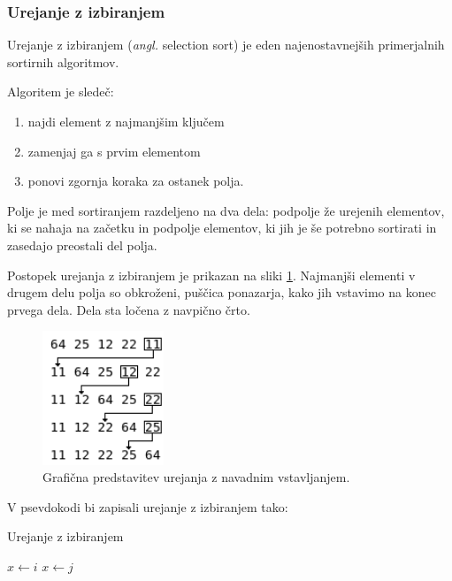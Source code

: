 \documentclass[a4paper,oneside]{article}
\begin{document}
\subsubsection{Urejanje z izbiranjem}
\label{chapter:selectionsort}
Urejanje z izbiranjem (\emph{angl.} selection sort) je eden najenostavnejših primerjalnih sortirnih
algoritmov.

Algoritem je sledeč:
\begin{enumerate}
  \item najdi element z najmanjšim ključem
  \item zamenjaj ga s prvim elementom
  \item ponovi zgornja koraka za ostanek polja.
\end{enumerate}

Polje je med sortiranjem razdeljeno na dva dela: podpolje že urejenih elementov, ki se
nahaja na začetku in podpolje elementov, ki jih je še potrebno sortirati in zasedajo
preostali del polja.

Postopek urejanja z izbiranjem je prikazan na sliki \ref{fig:selectionsortimage}.
Najmanjši elementi v drugem delu polja so obkroženi, puščica ponazarja, kako jih
vstavimo na konec prvega dela. Dela sta ločena z navpično črto. %

\begin{figure}[h]
    \begin{center}
        \includegraphics[height=40mm]{slike/selectionsort.png}
    \end{center}
    \vspace{-0.7cm}
    \caption{Grafična predstavitev urejanja z navadnim vstavljanjem.}
    \label{fig:selectionsortimage}
\end{figure}

V psevdokodi bi zapisali urejanje z izbiranjem tako:

\begin{algorithm}
  \caption{Urejanje z izbiranjem}\label{algo:selectionsort}
  \begin{algorithmic}[1]
            \State $x \gets i$
                    \State $x \gets j$
                \EndIf
            \EndFor
        \EndFor
    \EndFunction
  \end{algorithmic}
\end{algorithm}
\end{document}
